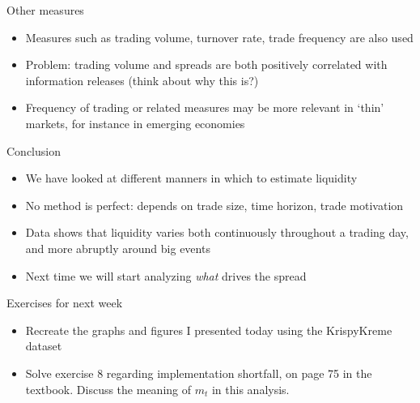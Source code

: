 \begin{frame}{Other measures}
\begin{itemize}
	\item Measures such as trading volume, turnover rate, trade frequency are also used
	\item Problem: trading volume and spreads are both positively correlated with information releases (think about why this is?)
	\item Frequency of trading or related measures may be more relevant in `thin' markets, for instance in emerging economies
\end{itemize}
\end{frame}


\begin{frame}{Conclusion}
	\begin{itemize}
		\item We have looked at different manners in which to estimate liquidity
		\item No method is perfect: depends on trade size, time horizon, trade motivation
		\item Data shows that liquidity varies both continuously throughout a trading day, and more abruptly around big events
		\item Next time we will start analyzing \textit{what} drives the spread
	\end{itemize}
\end{frame}


\begin{frame}{Exercises for next week}
	\begin{itemize}
		\item Recreate the graphs and figures I presented today using the KrispyKreme dataset
		\item Solve exercise 8 regarding implementation shortfall, on page 75 in the textbook.
		Discuss the meaning of $m_t$ in this analysis.
	\end{itemize}
\end{frame}


 